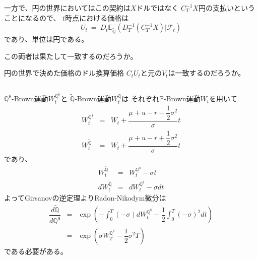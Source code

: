 \documentclass[uplatex,a4j,12pt,dvipdfmx]{jsarticle}
\begin{document}
一方で、円の世界においてはこの契約は$X$ドルではなく
$C^{-1}_{T} X$円の支払いということになるので、
$t$時点における価格は
$$
	U_{t}
	\ = \
	D_{t}
	\mathbb{E}_{\tilde{\mathbb{Q}}}
	( D^{-1}_{T} ( C^{-1}_{T} X ) | \mathcal{F}_{t} )
$$
であり、単位は円である。

この両者は果たして一致するのだろうか。

円の世界で決めた価格のドル換算価格
$C_{t} U_{t}$と元の$V_{t}$は一致するのだろうか。

${}$

$\mathbb{Q}^{\$}$-Brown運動$W^{\mathbb{Q}^{\$}}_{t}$と
$\tilde{\mathbb{Q}}$-Brown運動$W^{\tilde{\mathbb{Q}}}_{t}$は
それぞれ$\mathbb{P}$-Brown運動$W_{t}$を用いて
%
%
\begin{eqnarray*}
	W^{\mathbb{Q}^{\$}}_{t}
	&=&
	W_{t}
	+
	\dfrac{\mu + u -r - \dfrac{1}{2} \sigma^{2}}{\sigma} t
	\\
	W^{\tilde{\mathbb{Q}}}_{t}
	&=&
	W_{t}
	+
	\dfrac{\mu + u -r + \dfrac{1}{2} \sigma^{2}}{\sigma} t
\end{eqnarray*}
%
%
であり、
%
%
\begin{eqnarray*}
	W^{\tilde{\mathbb{Q}}}_{t}
	&=&
	W^{\mathbb{Q}^{\$}}_{t}
	-
	\sigma t
	\\
	d W^{\tilde{\mathbb{Q}}}_{t}
	&=&
	d W^{\mathbb{Q}^{\$}}_{t}
	-
	\sigma d t
\end{eqnarray*}
%
%
よってGirsanovの逆定理よりRadon-Nikodym微分は
%
%
\begin{eqnarray*}
	\dfrac{d \tilde{\mathbb{Q}}}{d \mathbb{Q}^{\$}}
	&=&
	\exp
	\left(
	- \int^{T}_{0} (- \sigma) d W^{\mathbb{Q}^{\$}}_{t}
	- \dfrac{1}{2} \int^{T}_{0} ( - \sigma)^{2} d t
	\right)
	\\ &=&
	\exp
	\left(
	\sigma W^{\mathbb{Q}^{\$}}_{T}
	- \dfrac{1}{2} \sigma^{2} T
	\right)
\end{eqnarray*}
%
%
である必要がある。
\end{document}
